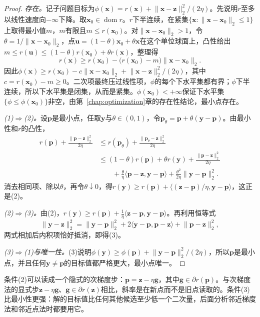 \begin{proof}
\emph{存在。}记子问题目标为$\phi(\bm x)=r(\bm x)+\lVert\bm x-\bm z\rVert_2^2/(2\eta)$。先说明$r$至多以线性速度向$-\infty$下降。取$\bm x_0\in\operatorname{dom}r$。$r$下半连续，在紧集$\{\bm x:\lVert\bm x-\bm x_0\rVert_2\leq1\}$上取得最小值$m$，$m$有限且$m\leq r(\bm x_0)$。对$\lVert\bm x-\bm x_0\rVert_2>1$，令$\theta=1/\lVert\bm x-\bm x_0\rVert_2$，点$\bm u=(1-\theta)\bm x_0+\theta\bm x$在这个单位球面上，凸性给出$m\leq r(\bm u)\leq(1-\theta)r(\bm x_0)+\theta r(\bm x)$，整理得
\[
 r(\bm x)\geq r(\bm x_0)-\bigl(r(\bm x_0)-m\bigr)\lVert\bm x-\bm x_0\rVert_2 .
\]
因此$\phi(\bm x)\geq r(\bm x_0)-c\lVert\bm x-\bm x_0\rVert_2+\lVert\bm x-\bm z\rVert_2^2/(2\eta)$，其中$c=r(\bm x_0)-m\geq0$。二次项最终压过线性项，$\phi$的每个下水平集都有界；$\phi$下半连续，所以下水平集是闭集，从而是紧集。$\phi(\bm x_0)<+\infty$保证下水平集$\{\phi\leq\phi(\bm x_0)\}$非空，由第~\ref{chap:optimization}章的存在性结论，最小点存在。

\emph{(1)$\Rightarrow$(2)。}设$\bm p$是最小点，任取$\bm y$与$\theta\in(0,1)$，令$\bm p_\theta=\bm p+\theta(\bm y-\bm p)$。由最小性和$r$的凸性，
\[
 \begin{aligned}
 r(\bm p)+\frac{\lVert\bm p-\bm z\rVert_2^2}{2\eta}
 &\leq r(\bm p_\theta)+\frac{\lVert\bm p_\theta-\bm z\rVert_2^2}{2\eta}\\
 &\leq(1-\theta)r(\bm p)+\theta r(\bm y)+\frac{\lVert\bm p-\bm z\rVert_2^2}{2\eta}\\
 &\qquad+\frac\theta\eta\langle\bm p-\bm z,\bm y-\bm p\rangle+\frac{\theta^2}{2\eta}\lVert\bm y-\bm p\rVert_2^2.
 \end{aligned}
\]
消去相同项、除以$\theta$，再令$\theta\downarrow0$，得$r(\bm y)\geq r(\bm p)+\langle(\bm z-\bm p)/\eta,\bm y-\bm p\rangle$，这正是(2)。

\emph{(2)$\Rightarrow$(3)。}由(2)，$r(\bm y)\geq r(\bm p)+\frac1\eta\langle\bm z-\bm p,\bm y-\bm p\rangle$。再利用恒等式
\[
 \lVert\bm y-\bm z\rVert_2^2=\lVert\bm y-\bm p\rVert_2^2+2\langle\bm y-\bm p,\bm p-\bm z\rangle+\lVert\bm p-\bm z\rVert_2^2,
\]
两式相加后内积项恰好抵消，即得(3)。

\emph{(3)$\Rightarrow$(1)与唯一性。}(3)说明$\phi(\bm y)\geq\phi(\bm p)+\lVert\bm y-\bm p\rVert_2^2/(2\eta)$，所以$\bm p$是最小点，并且任何$\bm y\neq\bm p$的目标值都严格更大，最小点唯一。
\end{proof}

条件(2)可以读成一个隐式的次梯度步：$\bm p=\bm z-\eta\bm g$，其中$\bm g\in\partial r(\bm p)$。与次梯度法的显式步$\bm z-\eta\bm g$、$\bm g\in\partial r(\bm z)$相比，斜率是在新点而不是旧点读取的。条件(3)比最小性更强：解的目标值比任何其他候选至少低一个二次量，后面分析邻近梯度法和邻近点法时都要用它。

